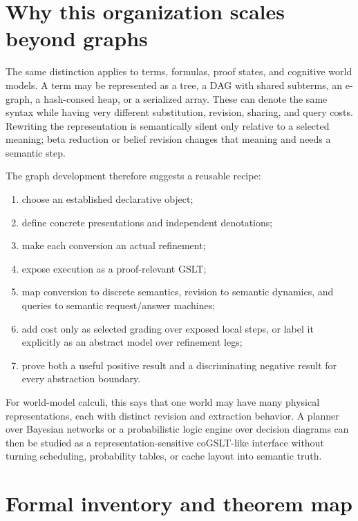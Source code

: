 \documentclass[11pt]{article}
\theoremstyle{remark}
\begin{document}
\section{Why this organization scales beyond graphs}
\label{sec:logic}

The same distinction applies to terms, formulas, proof states, and cognitive
world models.  A term may be represented as a tree, a DAG with shared
subterms, an e-graph, a hash-consed heap, or a serialized array.  These can
denote the same syntax while having very different substitution, revision,
sharing, and query costs.  Rewriting the representation is semantically silent
only relative to a selected meaning; beta reduction or belief revision changes
that meaning and needs a semantic step.

The graph development therefore suggests a reusable recipe:
\begin{enumerate}[label=\arabic*.,leftmargin=2.2em]
  \item choose an established declarative object;
  \item define concrete presentations and independent denotations;
  \item make each conversion an actual refinement;
  \item expose execution as a proof-relevant GSLT;
  \item map conversion to discrete semantics, revision to semantic dynamics,
        and queries to semantic request/answer machines;
  \item add cost only as selected grading over exposed local steps, or label it
        explicitly as an abstract model over refinement legs;
  \item prove both a useful positive result and a discriminating negative
        result for every abstraction boundary.
\end{enumerate}
For world-model calculi, this says that one world may have many physical
representations, each with distinct revision and extraction behavior.  A
planner over Bayesian networks or a probabilistic logic engine over decision
diagrams can then be studied as a representation-sensitive coGSLT-like
interface without turning scheduling, probability tables, or cache layout into
semantic truth.

\section{Formal inventory and theorem map}
\label{sec:inventory}
\end{document}

